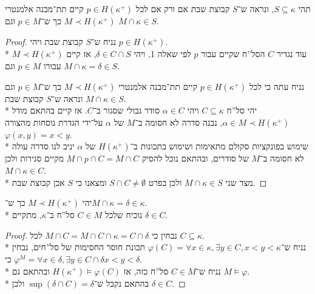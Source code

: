 \question{}
תהי $S \subseteq \kappa$, ונראה ש־$S$ קבוצת שבת אם ורק אם לכל $p \in H(\kappa^+)$ קיים תת־מבנה אלמנטרי $M \prec H(\kappa^+)$ כך ש־$p \in M$ וגם $M \cap \kappa \in S$.
\begin{proof}
	נניח ש־$S$ קבוצת שבת ויהי $p \in H(\kappa^+)$. \\*
	עוד נגדיר $C$ הסל''ח שקיים עבור $p$ לפי שאלה 1, ויהי $\delta \in C \cap S$, אז קיים $M \prec H(\kappa^+)$ עבורו $p \in M$ וגם $M \cap \kappa = \delta \in S$.

	נניח עתה כי לכל $p \in H(\kappa^+)$ קיים תת־מבנה אלמנטרי $M \prec H(\kappa^+)$ כך ש־$p \in M$ וגם $M \cap \kappa \in S$ ונראה ש־$S$ קבוצת שבת. \\*
	יהי סל''ח $C \subseteq \kappa$ ויהי $\alpha \in C$ סודר גבולי שסגור ב־$C$. אז קיים בהתאם מודל $\alpha \in M \prec H(\kappa^+)$, נבנה סדרה לא חסומה ב־$M$ של $\alpha$ על־ידי הגדרת נוסחות מהצורה $\varphi(x, y) = x < y$. \\*
	שימוש בפונקציות סקולם מתאימות ושימוש בתכונות ב־$H(\kappa^+)$ של $\alpha$ יניב לנו סדרה עולה לא חסומה ב־$M$ של סודרים, ובהתאם נוכל להסיק $M \cap p \cap C = M \cap C$ מקיים סגירות ולכן $M \cap \kappa \in C$. \\*
	מצד שני $M \cap \kappa \in S$ ולכן בפרט $S \cap C \ne \emptyset$ ומצאנו כי $S$ אכן קבוצת שבת.

\end{proof}

\question{}
יהי $M \prec H(\kappa^+)$ כך ש־$M \cap \kappa = \delta \in \kappa$. \\*
נוכיח שלכל $C \in M$ סל''ח ב־$\kappa$, מתקיים $\delta \in C$.
\begin{proof}
	נבחין כי $M \cap C = M \cap C \cap \kappa = C \cap \delta$ לכל $C \subseteq \kappa$. \\*
	נניח ש־$\varphi(C) = \forall x \in \kappa, \exists y \in C, x < y < \kappa$ תכונת חוסר החסימות של סל''חים,
	נבחין כי $\varphi^M = \forall x \in \delta, \exists y \in C \cap \delta x < y < \delta$. \\*
	נניח ש־$C \in M$ סל''ח כזה, אז $H(\kappa^+) \models \varphi(C)$ ובהתאם גם $M \models \varphi$. \\*
	בהתאם נקבל ש־$\sup(\delta \cap C) = \delta$ ולכן $\delta \in C$.
\end{proof}

